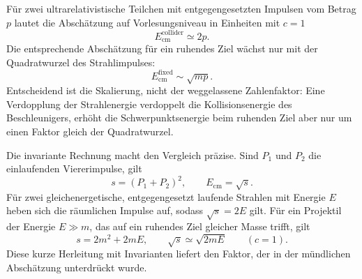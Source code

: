 Für zwei ultrarelativistische Teilchen mit entgegengesetzten Impulsen vom Betrag \(p\) lautet die Abschätzung auf Vorlesungsniveau in Einheiten mit \(c=1\)
\begin{equation}
E_{\mathrm{cm}}^{\mathrm{collider}}\simeq 2p.
\end{equation}
Die entsprechende Abschätzung für ein ruhendes Ziel wächst nur mit der Quadratwurzel des Strahlimpulses:
\begin{equation}
E_{\mathrm{cm}}^{\mathrm{fixed}}\sim \sqrt{mp}.
\end{equation}
Entscheidend ist die Skalierung, nicht der weggelassene Zahlenfaktor: Eine Verdopplung der Strahlenergie verdoppelt die Kollisionsenergie des Beschleunigers, erhöht die Schwerpunktsenergie beim ruhenden Ziel aber nur um einen Faktor gleich der Quadratwurzel.

Die invariante Rechnung macht den Vergleich präzise. Sind \(P_1\) und \(P_2\) die einlaufenden Viererimpulse, gilt
\begin{equation}
s=(P_1+P_2)^2,
\qquad E_{\mathrm{cm}}=\sqrt{s}.
\end{equation}
Für zwei gleichenergetische, entgegengesetzt laufende Strahlen mit Energie \(E\) heben sich die räumlichen Impulse auf, sodass \(\sqrt{s}=2E\) gilt. Für ein Projektil der Energie \(E\gg m\), das auf ein ruhendes Ziel gleicher Masse trifft, gilt
\begin{equation}
s=2m^2+2mE,
\qquad
\sqrt{s}\simeq \sqrt{2mE}
\qquad (c=1).
\end{equation}
Diese kurze Herleitung mit Invarianten liefert den Faktor, der in der mündlichen Abschätzung unterdrückt wurde.

\begin{classroomqa}
\end{classroomqa}


